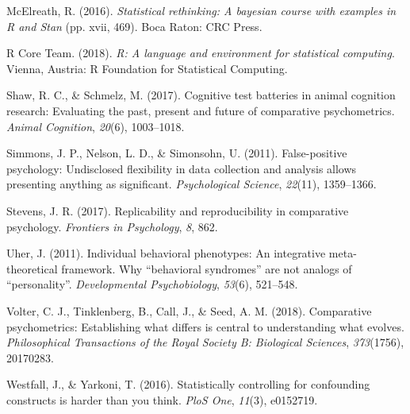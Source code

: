 \documentclass[10pt, letterpaper]{article}
\begin{document}
\leavevmode\hypertarget{ref-rethinking}{}%
McElreath, R. (2016). \emph{Statistical rethinking: A bayesian course
with examples in R and Stan} (pp. xvii, 469). Boca Raton: CRC Press.

\leavevmode\hypertarget{ref-R-base}{}%
R Core Team. (2018). \emph{R: A language and environment for statistical
computing}. Vienna, Austria: R Foundation for Statistical Computing.

\leavevmode\hypertarget{ref-shaw2017cognitive}{}%
Shaw, R. C., \& Schmelz, M. (2017). Cognitive test batteries in animal
cognition research: Evaluating the past, present and future of
comparative psychometrics. \emph{Animal Cognition}, \emph{20}(6),
1003--1018.

\leavevmode\hypertarget{ref-simmons2011false}{}%
Simmons, J. P., Nelson, L. D., \& Simonsohn, U. (2011). False-positive
psychology: Undisclosed flexibility in data collection and analysis
allows presenting anything as significant. \emph{Psychological Science},
\emph{22}(11), 1359--1366.

\leavevmode\hypertarget{ref-stevens2017replicability}{}%
Stevens, J. R. (2017). Replicability and reproducibility in comparative
psychology. \emph{Frontiers in Psychology}, \emph{8}, 862.

\leavevmode\hypertarget{ref-uher2011individual}{}%
Uher, J. (2011). Individual behavioral phenotypes: An integrative
meta-theoretical framework. Why ``behavioral syndromes'' are not analogs
of ``personality''. \emph{Developmental Psychobiology}, \emph{53}(6),
521--548.

\leavevmode\hypertarget{ref-volter2018comparative}{}%
Volter, C. J., Tinklenberg, B., Call, J., \& Seed, A. M. (2018).
Comparative psychometrics: Establishing what differs is central to
understanding what evolves. \emph{Philosophical Transactions of the
Royal Society B: Biological Sciences}, \emph{373}(1756), 20170283.

\leavevmode\hypertarget{ref-westfall2016statistically}{}%
Westfall, J., \& Yarkoni, T. (2016). Statistically controlling for
confounding constructs is harder than you think. \emph{PloS One},
\emph{11}(3), e0152719.


\end{document}

